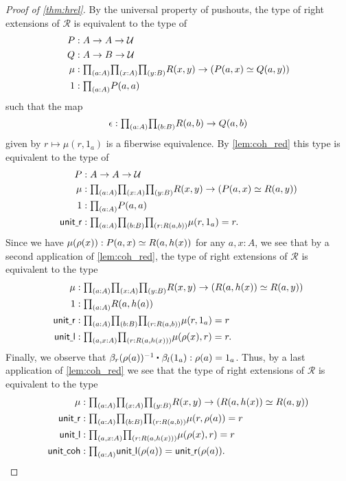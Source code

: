 \begin{proof}[Proof of \autoref{thm:hrel}]
By the universal property of pushouts, the type of right extensions of $\mathcal{R}$ is equivalent to the type of
\begin{align*}
P & : A\to A \to \UU \\
Q & : A \to B \to \UU \\
\mu & : \prd{a:A}{x:A}{y:B} R(x,y)\to (P(a,x)\eqvsym Q(a,y)) \\
1 & : \prd{a:A} P(a,a)
\end{align*}
such that the map
\begin{equation*}
\epsilon : \prd{a:A}{b:B} R(a,b)\to Q(a,b)
\end{equation*}
given by $r\mapsto \mu(r,1_a)$ is a fiberwise equivalence. By \autoref{lem:coh_red} this type is equivalent to the type of
\begin{align*}
P & : A\to A \to \UU \\
\mu & : \prd{a:A}{x:A}{y:B} R(x,y)\to (P(a,x)\eqvsym R(a,y)) \\
1 & : \prd{a:A} P(a,a) \\
\mathsf{unit\underline{~}r} & : \prd{a:A}{b:B}{r:R(a,b)} \mu(r,1_a)=r.
\end{align*}
Since we have $\mu(\rho(x)) : P(a,x) \simeq R(a,h(x))$ for any $a,x:A$, we see that by a second application of \autoref{lem:coh_red}, the type of right extensions of $\mathcal{R}$ is equivalent to the type
\begin{align*}
\mu & : \prd{a:A}{x:A}{y:B} R(x,y)\to (R(a,h(x))\eqvsym R(a,y)) \\
1 & : \prd{a:A} R(a,h(a)) \\
\mathsf{unit\underline{~}r} & : \prd{a:A}{b:B}{r:R(a,b)} \mu(r,1_a)=r \\
\mathsf{unit\underline{~}l} & : \prd{a,x:A}{r:R(a,h(x))} \mu(\rho(x),r)=r.
\end{align*}
Finally, we observe that $\ct{\beta_r(\rho(a))^{-1}}{\beta_l(1_a)}:\rho(a)=1_a$. Thus, by a last application of \autoref{lem:coh_red} we see that the type of right extensions of $\mathcal{R}$ is equivalent to the type
\begin{align*}
\mu & : \prd{a:A}{x:A}{y:B} R(x,y)\to (R(a,h(x))\eqvsym R(a,y)) \\
\mathsf{unit\underline{~}r} & : \prd{a:A}{b:B}{r:R(a,b)} \mu(r,\rho(a))=r \\
\mathsf{unit\underline{~}l} & : \prd{a,x:A}{r:R(a,h(x))} \mu(\rho(x),r)=r \\
\mathsf{unit\underline{~}coh} & : \prd{a:A} \mathsf{unit\underline{~}l}(\rho(a))=\mathsf{unit\underline{~}r}(\rho(a)).\qedhere
\end{align*}
\end{proof}


